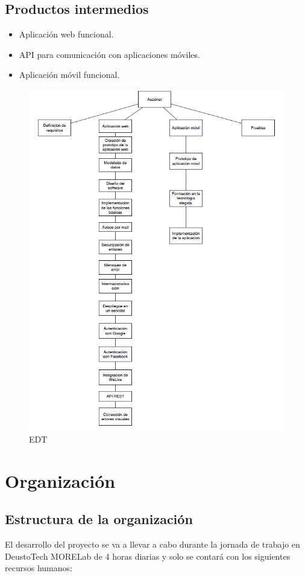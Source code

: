 \documentclass{DeustoFDP}
\begin{document}
\subsection{Productos intermedios}
\begin{itemize}
  \item Aplicación web funcional.
  \item API para comunicación con aplicaciones móviles.
  \item Aplicación móvil funcional.
\end{itemize}
\newpage
\begin{figure}[H]
    \centering
    \includegraphics{fig/EDT}
    \caption{EDT}\label{fig:edt}
\end{figure}

\section{Organización}
\subsection{Estructura de la organización}
El desarrollo del proyecto se va a llevar a cabo durante la jornada de trabajo en DeustoTech MORELab de 4 horas diarias y solo se contará con los siguientes recursos humanos:
\end{document}
